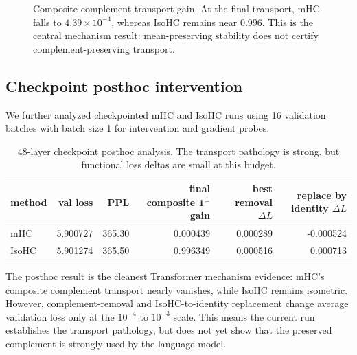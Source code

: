 \documentclass[10pt]{article}
\newcommand{\one}{\mathbf{1}}
\newcommand{\operp}{\one^{\perp}}
\begin{document}
\begin{figure}[t]
\centering
{}
\caption{Composite complement transport gain.  At the final transport,
mHC falls to $4.39\times 10^{-4}$, whereas IsoHC remains near $0.996$.  This
is the central mechanism result: mean-preserving stability does not certify
complement-preserving transport.}
\label{fig:composite}
\end{figure}

\subsection{Checkpoint posthoc intervention}

We further analyzed checkpointed mHC and IsoHC runs using 16 validation batches
with batch size 1 for intervention and gradient probes.

\begin{table}[t]
\centering
\caption{48-layer checkpoint posthoc analysis.  The transport pathology is
strong, but functional loss deltas are small at this budget.}
\label{tab:posthoc}
\begin{tabular}{lrrrrr}
\toprule
method & val loss & PPL & final composite $\operp$ gain & best removal $\Delta L$ & replace by identity $\Delta L$ \\
\midrule
mHC & 5.900727 & 365.30 & 0.000439 & 0.000289 & -0.000524 \\
IsoHC & 5.901274 & 365.50 & 0.996349 & 0.000516 & 0.000713 \\
\bottomrule
\end{tabular}
\end{table}

The posthoc result is the cleanest Transformer mechanism evidence: mHC's
composite complement transport nearly vanishes, while IsoHC remains isometric.
However, complement-removal and IsoHC-to-identity replacement change average
validation loss only at the $10^{-4}$ to $10^{-3}$ scale.  This means the current
run establishes the transport pathology, but does not yet show that the
preserved complement is strongly used by the language model.
\end{document}
